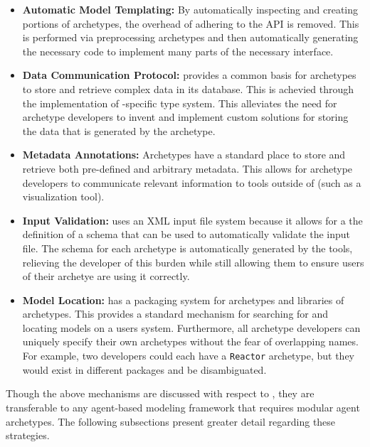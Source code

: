 \begin{itemize}
\item \textbf{Automatic Model Templating:} By automatically inspecting and
  creating portions of archetypes, the overhead of adhering to the \Cyclus
  \gls{API} is removed. This is performed via preprocessing archetypes and
  then automatically generating the necessary code to implement many parts of
  the necessary interface.

\item \textbf{Data Communication Protocol:} \Cyclus provides a common basis
  for archetypes to store and retrieve complex data in its database. This is
  achevied through the implementation of \Cyclus-specific type system.  This
  alleviates the need for archetype developers to invent and implement custom
  solutions for storing the data that is generated by the archetype.

\item \textbf{Metadata Annotations:} Archetypes have a standard place to store
  and retrieve both pre-defined and arbitrary metadata.  This allows for
  archetype developers to communicate relevant information to tools outside of
  \Cyclus (such as a visualization tool).

\item \textbf{Input Validation:} \Cyclus uses an \gls{XML} input file system
  because it allows for a the definition of a schema that can be used to
  automatically validate the input file.  The schema for each archetype is
  automatically generated by the \Cyclus tools, relieving the developer of
  this burden while still allowing them to ensure users of their archetye are
  using it correctly.

\item \textbf{Model Location:} \Cyclus has a packaging system for archetypes
  and libraries of archetypes. This provides a standard mechanism for
  searching for and locating models on a users system.  Furthermore, all
  archetype developers can uniquely specify their own archetypes without the
  fear of overlapping names.  For example, two developers could each have a
  \texttt{Reactor} archetype, but they would exist in different packages and
  be disambiguated.

\end{itemize}

Though the above mechanisms are discussed with respect to \Cyclus, they are
transferable to any agent-based modeling framework that requires modular agent
archetypes. The following subsections present greater detail regarding these
strategies.

